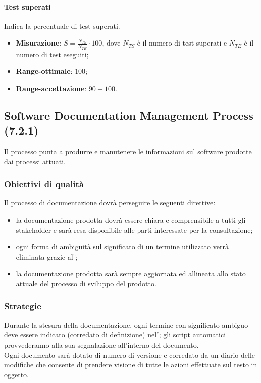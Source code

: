 \paragraph{Test superati}
\label{tsuperati}
Indica la percentuale di test superati.
\begin{itemize}
\item \textbf{Misurazione}: $S=\frac{N_{TS}}{N_{TE}} \cdot 100$, dove $N_{TS}$ è il numero di test superati e $N_{TE}$ è il numero di test eseguiti;
\item \textbf{Range-ottimale}: $100$;
\item \textbf{Range-accettazione}: $90 - 100$.
\end{itemize}

\subsection{Software Documentation Management Process (7.2.1)}
\label{soDocMgmt}
Il processo punta a produrre e manutenere le informazioni sul software prodotte dai processi attuati.
\subsubsection{Obiettivi di qualità}
Il processo di documentazione dovrà perseguire le seguenti direttive:
\begin{itemize}
\item la documentazione prodotta dovrà essere chiara e comprensibile a tutti gli stakeholder e sarà resa disponibile alle parti interessate per la consultazione;
\item ogni forma di ambiguità sul significato di un termine utilizzato verrà eliminata grazie al \textit{\G};
\item la documentazione prodotta sarà sempre aggiornata ed allineata allo stato attuale del processo di sviluppo del prodotto.
\end{itemize}
\subsubsection{Strategie}
Durante la stesura della documentazione, ogni termine con significato ambiguo deve essere indicato (corredato di definizione) nel \textit{\G}; gli script automatici provvederanno alla sua segnalazione all'interno del documento.\\
Ogni documento sarà dotato di numero di versione e corredato da un diario delle modifiche che consente di prendere visione di tutte le azioni effettuate sul testo in oggetto.
